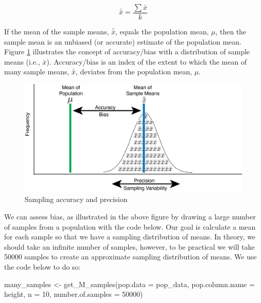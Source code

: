 \documentclass[
]{krantz}
\makeatletter
\newenvironment{Shaded}{\begin{snugshade}}{\end{snugshade}}
\newcommand{\AttributeTok}[1]{\textcolor[rgb]{0.61,0.61,0.61}{#1}}
\newcommand{\DecValTok}[1]{\textcolor[rgb]{0.06,0.06,0.06}{#1}}
\newcommand{\FunctionTok}[1]{\textcolor[rgb]{0,0,0}{#1}}
\newcommand{\NormalTok}[1]{#1}
\newcommand{\OtherTok}[1]{\textcolor[rgb]{0.37,0.37,0.37}{#1}}
\newenvironment{kframe}{%
\medskip{}
\setlength{\fboxsep}{.8em}
 \def\at@end@of@kframe{}%
 \ifinner\ifhmode%
  \def\at@end@of@kframe{\end{minipage}}%
  \begin{minipage}{\columnwidth}%
 \fi\fi%
 \def\FrameCommand##1{\hskip\@totalleftmargin \hskip-\fboxsep
 \colorbox{shadecolor}{##1}\hskip-\fboxsep
     \hskip-\linewidth \hskip-\@totalleftmargin \hskip\columnwidth}%
 \MakeFramed {\advance\hsize-\width
   \@totalleftmargin\z@ \linewidth\hsize
   \@setminipage}}%
 {\par\unskip\endMakeFramed%
 \at@end@of@kframe}
\renewenvironment{Shaded}{\begin{kframe}}{\end{kframe}}
\makeatother
\begin{document}
\begin{equation} 
\bar{\bar{x}} = \frac{\sum{\bar{x}}}{k}
      \label{eq:samplemeanmeanch5}
\end{equation}

If the mean of the sample means, \(\bar{\bar{x}}\), equals the population mean, \(\mu\), then the sample mean is an unbiased (or accurate) estimate of the population mean. Figure \ref{fig:showbias} illustrates the concept of accuracy/bias with a distribution of sample means (i.e., \(\bar{x}\)). Accuracy/bias is an index of the extent to which the mean of many sample means, \(\bar{\bar{x}}\), deviates from the population mean, \(\mu\).

\begin{figure}
\includegraphics[width=0.8\linewidth]{ch_samples/images/sampling_accuracy} \caption{Sampling accuracy and precision}\label{fig:showbias}
\end{figure}

We can assess bias, as illustrated in the above figure by drawing a large number of samples from a population with the code below. Our goal is calculate a mean for each sample so that we have a sampling distribution of means. In theory, we should take an infinite number of samples, however, to be practical we will take 50000 samples to create an approximate sampling distribution of means. We use the code below to do so:

\begin{Shaded}
\begin{Highlighting}[]
\NormalTok{many\_samples }\OtherTok{\textless{}{-}} \FunctionTok{get\_M\_samples}\NormalTok{(}\AttributeTok{pop.data =}\NormalTok{ pop\_data, }
                              \AttributeTok{pop.column.name =}\NormalTok{ height,}
                              \AttributeTok{n =} \DecValTok{10}\NormalTok{,}
                              \AttributeTok{number.of.samples =} \DecValTok{50000}\NormalTok{)}
\end{Highlighting}
\end{Shaded}
\end{document}
